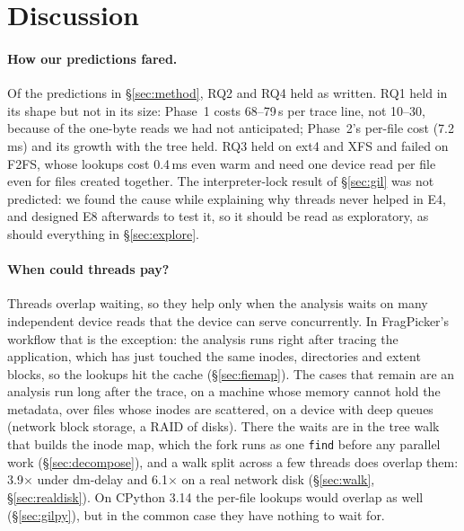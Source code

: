 \section{Discussion}
\label{sec:discussion}

\paragraph{How our predictions fared.} Of the predictions in \S\ref{sec:method}, RQ2
and RQ4 held as written. RQ1 held in its shape but not in its size: Phase~1 costs
68--79\,\textmu s per trace line, not 10--30, because of the one-byte reads we had not
anticipated; Phase~2's per-file cost (7.2\,ms) and its growth with the tree held. RQ3
held on ext4 and XFS and failed on F2FS, whose lookups cost 0.4\,ms even warm and need
one device read per file even for files created together. The interpreter-lock result
of \S\ref{sec:gil} was not predicted: we found the cause while explaining why threads
never helped in E4, and designed E8 afterwards to test it, so it should be read as
exploratory, as should everything in \S\ref{sec:explore}.

\paragraph{When could threads pay?}
Threads overlap waiting, so they help only when the analysis waits on many
independent device reads that the device can serve concurrently. In FragPicker's
workflow that is the exception: the analysis runs right after tracing the
application, which has just touched the same inodes, directories and extent blocks,
so the lookups hit the cache (\S\ref{sec:fiemap}). The cases that remain are an
analysis run long after the trace, on a machine whose memory cannot hold the
metadata, over files whose inodes are scattered, on a device with deep queues
(network block storage, a RAID of disks). There the waits are in the tree walk that
builds the inode map, which the fork runs as one \texttt{find} before any parallel
work (\S\ref{sec:decompose}), and a walk split across a few threads does overlap them:
3.9$\times$ under dm-delay and 6.1$\times$ on a real network disk (\S\ref{sec:walk},
\S\ref{sec:realdisk}). On CPython 3.14 the per-file lookups would overlap as well
(\S\ref{sec:gilpy}), but in the common case they have nothing to wait for.

